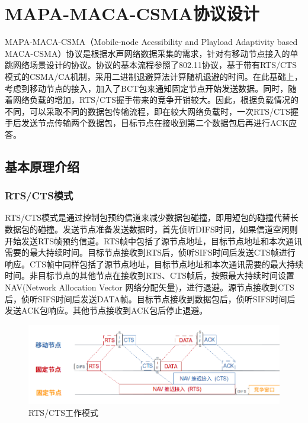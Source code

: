\chapter{MAPA-MACA-CSMA协议设计}
MAPA-MACA-CSMA（Mobile-node Accssibility and Playload Adaptivity based MACA-CSMA）协议是根据水声网络数据采集的需求，针对有移动节点接入的单跳网络场景设计的协议。协议的基本流程参照了802.11协议，基于带有RTS/CTS模式的CSMA/CA机制，采用二进制退避算法计算随机退避的时间。在此基础上，考虑到移动节点的接入，加入了BCT包来通知固定节点开始发送数据。同时，随着网络负载的增加，RTS/CTS握手带来的竞争开销较大。因此，根据负载情况的不同，可以采取不同的数据包传输流程，即在较大网络负载时，一次RTS/CTS握手后发送节点传输两个数据包，目标节点在接收到第二个数据包后再进行ACK应答。

\section {基本原理介绍}
\subsection{RTS/CTS模式}
RTS/CTS模式是通过控制包预约信道来减少数据包碰撞，即用短包的碰撞代替长数据包的碰撞。发送节点准备发送数据时，首先侦听DIFS时间，如果信道空闲则开始发送RTS帧预约信道。RTS帧中包括了源节点地址，目标节点地址和本次通讯需要的最大持续时间。目标节点接收到RTS后，侦听SIFS时间后发送CTS帧进行响应。CTS帧中同样包括了源节点地址，目标节点地址和本次通讯需要的最大持续时间。非目标节点的其他节点在接收到RTS、CTS帧后，按照最大持续时间设置NAV(Network Allocation Vector 网络分配矢量)，进行退避。源节点接收到CTS后，侦听SIFS时间后发送DATA帧。目标节点接收到数据包后，侦听SIFS时间后发送ACK包响应。其他节点接收到ACK包后停止退避。
\begin{figure}[ht]
	\centering
	\includegraphics[scale=0.4]{figures/rtscts.png}
	\caption{
		RTS/CTS工作模式
	}
	\label{fig:example}
\end{figure}
